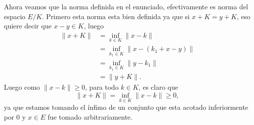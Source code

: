 \begin{itemize}
\begin{itemize}
\begin{sproof}
            Ahora veamos que la norma definida en el enunciado, efectivamente es norma del espacio $E/K.$ Primero esta norma esta bien definida ya que si $x+K=y+K$, eso quiere decir que $x-y\in K$, luego
            \begin{align*}
                 \|x+K\|&=\inf_{k\in K}\|x-k\|\\
                 &=\inf_{k_1\in K}\|x-(k_1+x-y)\|\\
                 &=\inf_{k_1\in K}\|y-k_1\|\\
                 &=\|y+K\|.
             \end{align*}
             Luego como $\|x-k\|\geq 0$, para todo $k\in K$, es claro que 
            $$\|x+K\|=\inf_{k\in K}\|x-k\|\geq 0,$$
            ya que estamos tomando el ínfimo de un conjunto que esta acotado inferiormente por $0$ y $x\in E$ fue tomado arbitrariamente.\\


\end{sproof}
\end{itemize}
\end{itemize}
